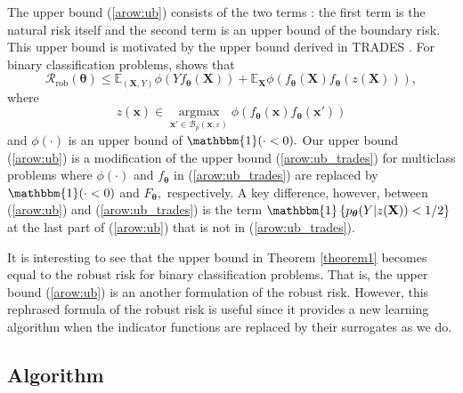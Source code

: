 \documentclass[nohyperref]{article}
\theoremstyle{plain}
\theoremstyle{definition}
\theoremstyle{remark}
\begin{document}
The upper bound (\ref{arow:ub}) consists of the two terms : the first term is the natural risk itself and the second term is an upper bound of the boundary risk.
This upper bound is motivated by the upper bound derived in TRADES \citep{zhang2019theoretically}. For binary classification problems, \cite{zhang2019theoretically} shows that
\begin{equation} 
    \mathcal{R}_{\text{rob}}(\bm{\theta}) \leq \mathbb{E}_{(\mathbf{X},Y)} \phi(Y f_{\bm{\theta}}(\mathbf{X})) +
    \mathbb{E}_{\mathbf{X}}{\phi(f_{\bm{\theta}}(\mathbf{X}) f_{\bm{\theta}}(z(\mathbf{X})))}, \label{arow:ub_trades}
\end{equation}
where 
$$
z(\bm{x}) \in \underset{\bm{x}' \in \mathcal{B}_{p}(\bm{x}, \varepsilon)}{\operatorname{argmax}} \phi \left( f_{\bm{\theta}}(\bm{x}) f_{\bm{\theta}}(\bm{x}')\right)
$$
and $\phi(\cdot)$ is an upper bound of
$\mathbbm{1}(\cdot <0).$
Our upper bound (\ref{arow:ub}) is a modification of the upper bound (\ref{arow:ub_trades}) for multiclass problems
where $\phi(\cdot)$ and $f_{\bm{\theta}}$ in (\ref{arow:ub_trades})
are replaced by $\mathbbm{1}(\cdot <0)$
 and $F_{\bm{\theta}},$ respectively.  
A key difference, however, between
(\ref{arow:ub}) and (\ref{arow:ub_trades})
is the term $\mathbbm{1} \left\{ p_{\bm{\theta}}(Y | z(\mathbf{X})) < 1/2 \right\}$ at the last part of (\ref{arow:ub})
that is not in (\ref{arow:ub_trades}). 


It is interesting to see that 
the upper bound in Theorem \ref{theorem1} becomes equal to the robust risk for binary classification problems.
That is, the upper bound (\ref{arow:ub}) is an another formulation of the robust risk. However,
this rephrased formula of the robust risk is useful since it provides a new learning algorithm
when the indicator functions are replaced by their surrogates as we do.

\subsection{Algorithm}
\end{document}
